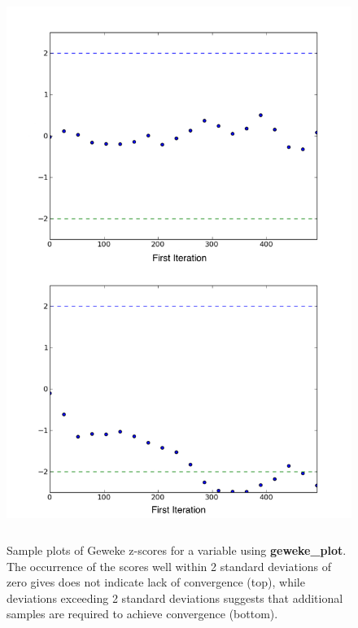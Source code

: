 \documentclass[]{jss}
\begin{document}
\begin{figure}[h!]
\begin{center}
\includegraphics[height=18cm]{geweke.png}
\caption{Sample plots of Geweke z-scores for a variable using \textbf{geweke_plot}. The occurrence of the scores well within 2 standard deviations of zero gives does not indicate lack of convergence (top), while deviations exceeding 2 standard deviations suggests that additional samples are required to achieve convergence (bottom).}
\label{fig:geweke}
\end{center}
\end{figure}
\end{document}
